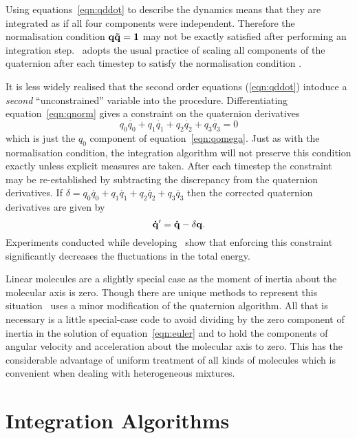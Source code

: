 Using equations~\ref{eqn:qddot} to describe the dynamics means that
they are integrated as if all four components were independent.
Therefore the normalisation condition $\bf q \tilde{q} = 1$ may not be
exactly satisfied after performing an integration step.  \moldy\
adopts the usual practice of scaling all components of the quaternion
after each timestep to satisfy the normalisation condition
\cite{evans:77b}.

It is less widely realised that the second order equations
(\ref{eqn:qddot}) intoduce a {\em second} ``unconstrained'' variable
into the procedure.  Differentiating equation~\ref{eqn:qnorm} gives a
constraint on the quaternion derivatives
\begin{equation}
q_0\dot{q_0} + q_1\dot{q_1} + q_2\dot{q_2} + q_3\dot{q_3} = 0
\label{eqn:qconst} 
\end{equation}
which is just the $q_0$ component of equation~\ref{eqn:qomega}.
Just as with the normalisation condition, the integration algorithm
will not preserve this condition exactly unless explicit measures are
taken.  After each timestep the constraint may be re-established by
subtracting the discrepancy from the quaternion derivatives.  If
$\delta = q_0\dot{q_0} + q_1\dot{q_1} + q_2\dot{q_2} + q_3\dot{q_3}$
then the corrected quaternion derivatives are given by
\begin{equation}
{\bf \dot{q}^\prime } =  {\bf \dot{q}} - \delta {\bf q} .
\label{eqn:qconcorr}
\end{equation}
Experiments conducted while developing \moldy\ show that enforcing
this constraint significantly decreases the fluctuations in the total
energy. 

Linear molecules are a slightly special case as the moment of inertia
about the molecular axis is zero.  Though there are unique methods to
represent this situation \cite[page 90]{allen:87} \moldy\ uses a minor
modification of the quaternion algorithm.  All that is necessary is a
little special-case code to avoid dividing by the zero component of
inertia in the solution of equation~\ref{eqn:euler} and to hold the
components of angular velocity and acceleration about the molecular
axis to zero.  This has the considerable advantage of uniform
treatment of all kinds of molecules which is convenient when dealing
with heterogeneous mixtures.

\section{Integration Algorithms}


